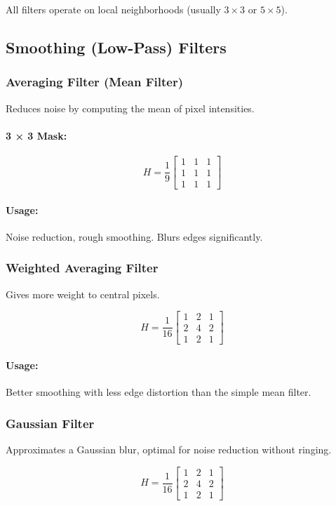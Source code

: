 \documentclass{AnantDocumentation}
\begin{document}
All filters operate on local neighborhoods (usually $3 \times 3$ or $5 \times 5$).

\subsection{Smoothing (Low-Pass) Filters}

\subsubsection{Averaging Filter (Mean Filter)}
Reduces noise by computing the mean of pixel intensities.

\paragraph{3 × 3 Mask:}
\[
H = \frac{1}{9}
\begin{bmatrix}
1 & 1 & 1\\
1 & 1 & 1\\
1 & 1 & 1
\end{bmatrix}
\]

\paragraph{Usage:}
Noise reduction, rough smoothing. Blurs edges significantly.

\subsubsection{Weighted Averaging Filter}
Gives more weight to central pixels.

\[
H = \frac{1}{16}
\begin{bmatrix}
1 & 2 & 1\\
2 & 4 & 2\\
1 & 2 & 1
\end{bmatrix}
\]

\paragraph{Usage:}
Better smoothing with less edge distortion than the simple mean filter.

\subsubsection{Gaussian Filter}
Approximates a Gaussian blur, optimal for noise reduction without ringing.

\[
H = \frac{1}{16}
\begin{bmatrix}
1 & 2 & 1\\
2 & 4 & 2\\
1 & 2 & 1
\end{bmatrix}
\]
\end{document}
